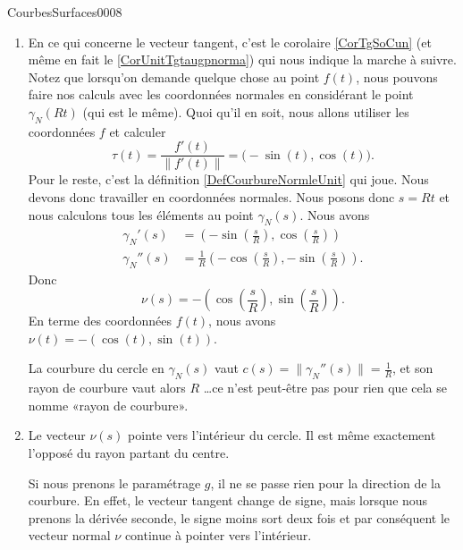\begin{corrige}{CourbesSurfaces0008}
\begin{enumerate}
		\item	
			En ce qui concerne le vecteur tangent, c'est le corolaire \ref{CorTgSoCun} (et même en fait le \ref{CorUnitTgtaugpnorma}) qui nous indique la marche à suivre. Notez que lorsqu'on demande quelque chose au point $f(t)$, nous pouvons faire nos calculs avec les coordonnées normales en considérant le point $\gamma_N(Rt)$ (qui est le même). Quoi qu'il en soit, nous allons utiliser les coordonnées $f$ et calculer 
			\begin{equation}
				\tau(t)=\frac{ f'(t) }{ \| f'(t) \| }=\big( -\sin(t),\cos(t) \big).
			\end{equation}
			Pour le reste, c'est la définition \ref{DefCourbureNormleUnit} qui joue. Nous devons donc travailler en coordonnées normales. Nous posons donc $s=Rt$ et nous calculons tous les éléments au point $\gamma_N(s)$. Nous avons
			\begin{subequations}
				\begin{align}
					\gamma_N'(s)&=\left( -\sin(\frac{ s }{ R }),\cos(\frac{ s }{ R }) \right)\\
					\gamma_N''(s)&=\frac{1}{ R }\left( -\cos(\frac{ s }{ R }),-\sin(\frac{ s }{ R }) \right).
				\end{align}
			\end{subequations}
			Donc
			\begin{equation}
				\nu(s)=-\left( \cos(\frac{ s }{ R }),\sin(\frac{ s }{ R }) \right).
			\end{equation}
			En terme des coordonnées $f(t)$, nous avons $\nu(t)=-\left( \cos(t),\sin(t) \right)$.
			
			La courbure du cercle en $\gamma_N(s)$ vaut $c(s)=\| \gamma_N''(s) \|=\frac{1}{ R }$, et son rayon de courbure vaut alors $R$ \ldots ce n'est peut-être pas pour rien que cela se nomme «rayon de courbure».

		\item
			Le vecteur $\nu(s)$ pointe vers l'intérieur du cercle. Il est même exactement l'opposé du rayon partant du centre.

			Si nous prenons le paramétrage $g$, il ne se passe rien pour la direction de la courbure. En effet, le vecteur tangent change de signe, mais lorsque nous prenons la dérivée seconde, le signe moins sort deux fois et par conséquent le vecteur normal $\nu$ continue à pointer vers l'intérieur.

	\end{enumerate}

\end{corrige}
